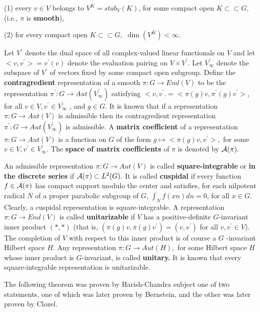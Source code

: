 (1) every $v\in V$ belongs to $V^K=stab_V(K)$, for some compact open $%
K\subset \subset G,$ (i.e., $\pi $ is {\bf smooth}),

(2) for every compact open $K\subset \subset G,$ $\dim (V^K)<\infty .$

Let $V^{\prime }$ denote the dual space of all complex-valued linear
functionals on $V$ and let $<v,v^{\prime }>=v^{\prime }(v)$ denote the
evaluation pairing on $V\times V^{\prime }$. Let $V_\infty ^{\prime }$
denote the subspace of $V^{\prime }$ of vectors fixed by some compact open
subgroup. Define the {\bf contragredient} representation of a smooth $\pi
:G\rightarrow End(V)$ to be the representation $\pi ^{\prime }:G\rightarrow
Aut(V_\infty ^{\prime })$ satisfying $<v,v^{\prime }.=<\pi (g)v,\pi ^{\prime
}(g)v^{\prime }>$, for all $v\in V,v^{\prime }\in V_\infty ^{\prime }$ , and 
$g\in G.$ It is known that if a representation $\pi :G\rightarrow Aut(V)$ is
admissible then its contragredient representation $\pi ^{\prime
}:G\rightarrow Aut(V_\infty ^{\prime })$ is admissible. A {\bf matrix
coefficient} of a representation $\pi :G\rightarrow Aut(V)$ is a function on 
$G$ of the form $g\longmapsto <\pi (g)v,v^{\prime }>,$ for some $v\in
V,v^{\prime }\in V_\infty ^{\prime }.$ The {\bf space of matrix coefficients}
of $\pi $ is denoted by ${\cal A}(\pi ).$

An admissible representation $\pi :G\rightarrow Aut(V)$ is called {\bf %
square-integrable} or {\bf in the discrete series} if ${\cal A}(\pi )\subset
L^2(G).$ It is called {\bf cuspidal} if every function $f\in {\cal A}(\pi )$
has compact support modulo the center and satisfies, for each nilpotent
radical $N$ of a proper parabolic subgroup of $G$, $\int_Nf(xn)dn=0$, for
all $x\in G$. Clearly, a cuspidal representation is square-integrable. A
representation $\pi :G\rightarrow End(V)$ is called {\bf unitarizable} if $V$
has a positive-definite $G$-invariant inner product $(*,*)$ (that is, $(\pi
(g)v,\pi (g)v^{\prime })=(v,v^{\prime })$ for all $v,v^{\prime }\in V$). The
completion of $V$ with respect to this inner product is of course a $G$%
-invariant Hilbert space $H$. Any representation $\pi :G\rightarrow Aut(H),$
for some Hilbert space $H$ whose inner product is $G$-invariant, is called 
{\bf unitary. }It is known that every square-integrable representation is
unitarizable.

The following theorem was proven by Harish-Chandra subject one of two
statements, one of which was later proven by Bernstein, and the other was
later proven by Clozel.

